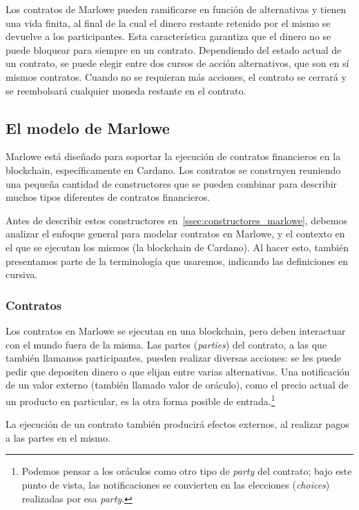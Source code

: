 \documentclass[12pt]{book}
\begin{document}
Los contratos de Marlowe pueden ramificarse en función de alternativas y tienen una vida finita, al final de la cual el dinero restante retenido por el mismo se devuelve a los participantes. Esta característica garantiza que el dinero no se puede bloquear para siempre en un contrato. Dependiendo del estado actual de un contrato, se puede elegir entre dos cursos de acción alternativos, que son en sí mismos contratos. Cuando no se requieran más acciones, el contrato se cerrará y se reembolsará cualquier moneda restante en el contrato.

\subsection{El modelo de Marlowe}\label{ssec:Modelo_de_marlowe}

Marlowe está diseñado para soportar la ejecución de contratos financieros en la blockchain, específicamente en Cardano. Los contratos se construyen reuniendo una pequeña cantidad de constructores que se pueden combinar para describir muchos tipos diferentes de contratos financieros.

Antes de describir estos constructores en~\ref{ssec:constructores_marlowe}, debemos analizar el enfoque general para modelar contratos en Marlowe, y el contexto en el que se ejecutan los mismos (la blockchain de Cardano). Al hacer esto, también presentamos parte de la terminología que usaremos, indicando las definiciones en cursiva.

\subsubsection{Contratos}
Los contratos en Marlowe se ejecutan en una blockchain, pero deben interactuar con el mundo fuera de la misma. Las partes (\textit{parties}) del contrato, a las que también llamamos participantes, pueden realizar diversas acciones: se les puede pedir que depositen dinero o que elijan entre varias alternativas. Una notificación de un valor externo (también llamado valor de oráculo), como el precio actual de un producto en particular, es la otra forma posible de entrada.\footnote{Podemos pensar a los oráculos como otro tipo de \textit{party} del contrato; bajo este punto de vista, las notificaciones se convierten en las elecciones (\textit{choices}) realizadas por esa \textit{party}.}

La ejecución de un contrato también producirá efectos externos, al realizar pagos a las partes en el mismo.
\end{document}
